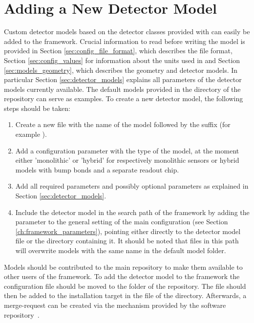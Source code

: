 \section{Adding a New Detector Model}
\label{sec:adding_detector_model}
Custom detector models based on the detector classes provided with \apsq can easily be added to the framework.
Crucial information to read before writing the model is provided in Section \ref{sec:config_file_format}, which  describes the file format, Section \ref{sec:config_values} for information about the units used in \apsq and Section \ref{sec:models_geometry}, which describes the geometry and detector models.
In particular Section \ref{sec:detector_models} explains all parameters of the detector models currently available.
The default models provided in the  directory of the repository can serve as examples.
To create a new detector model, the following steps should be taken:
\begin{enumerate}
\item Create a new file with the name of the model followed by the  suffix (for example ).
\item Add a configuration parameter  with the type of the model, at the moment either 'monolithic' or 'hybrid' for respectively monolithic sensors or hybrid models with bump bonds and a separate readout chip.
\item Add all required parameters and possibly optional parameters as explained in Section \ref{sec:detector_models}.
\item Include the detector model in the search path of the framework by adding the  parameter to the general setting of the main configuration (see Section \ref{ch:framework_parameters}), pointing either directly to the detector model file or the directory containing it. It should be noted that files in this path will overwrite models with the same name in the default model folder.
\end{enumerate}

Models should be contributed to the main repository to make them available to other users of the framework.
To add the detector model to the framework the configuration file should be moved to the  folder of the repository.
The file should then be added to the installation target in the  file of the  directory.
Afterwards, a merge-request can be created via the mechanism provided by the software repository~\cite{ap2-repo}.
